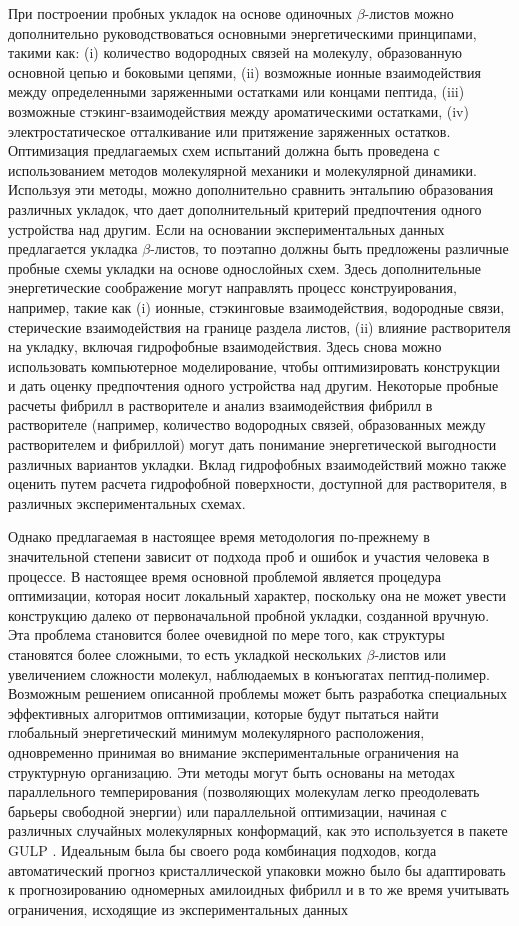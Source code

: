     При построении пробных укладок на основе одиночных $\beta$-листов можно дополнительно руководствоваться основными энергетическими принципами, такими как: (i) количество водородных связей на молекулу, образованную основной цепью и боковыми цепями, (ii) возможные ионные взаимодействия между определенными заряженными остатками или концами пептида, (iii) возможные стэкинг-взаимодействия между ароматическими остатками, (iv) электростатическое отталкивание или притяжение заряженных остатков. Оптимизация предлагаемых схем испытаний должна быть проведена с использованием методов молекулярной механики и молекулярной динамики. Используя эти методы, можно дополнительно сравнить энтальпию образования различных укладок, что дает дополнительный критерий предпочтения одного устройства над другим. Если на основании экспериментальных данных предлагается укладка $\beta$-листов, то поэтапно должны быть предложены различные пробные схемы укладки на основе однослойных схем. Здесь дополнительные энергетические соображение могут направлять процесс конструирования, например, такие как (i) ионные, стэкинговые взаимодействия, водородные связи, стерические взаимодействия на границе раздела листов, (ii) влияние растворителя на укладку, включая гидрофобные взаимодействия. Здесь снова можно использовать компьютерное моделирование, чтобы оптимизировать конструкции и дать оценку предпочтения одного устройства над другим. Некоторые пробные расчеты фибрилл в растворителе и анализ взаимодействия фибрилл в растворителе (например, количество водородных связей, образованных между растворителем и фибриллой) могут дать понимание энергетической выгодности различных вариантов укладки. Вклад гидрофобных взаимодействий можно также оценить путем расчета гидрофобной поверхности, доступной для растворителя, в различных экспериментальных схемах.
    
    Однако предлагаемая в настоящее время методология по-прежнему в значительной степени зависит от подхода проб и ошибок и участия человека в процессе. В настоящее время основной проблемой является процедура оптимизации, которая носит локальный характер, поскольку она не может увести конструкцию далеко от первоначальной пробной укладки, созданной вручную. Эта проблема становится более очевидной по мере того, как структуры становятся более сложными, то есть укладкой нескольких $\beta$-листов или увеличением сложности молекул, наблюдаемых в конъюгатах пептид-полимер. Возможным  решением описанной проблемы может быть разработка специальных эффективных алгоритмов оптимизации, которые будут пытаться найти глобальный энергетический минимум молекулярного расположения, одновременно принимая во внимание экспериментальные ограничения на структурную организацию. Эти методы могут быть основаны на методах параллельного темперирования (позволяющих молекулам легко преодолевать барьеры свободной энергии) \cite{deem_parallel_2005} или параллельной оптимизации, начиная с различных случайных молекулярных конформаций, как это используется в пакете GULP \cite{gale_general_2003}. Идеальным была бы своего рода комбинация подходов, когда автоматический прогноз кристаллической упаковки можно было бы адаптировать к прогнозированию одномерных амилоидных фибрилл и в то же время учитывать ограничения, исходящие из экспериментальных данных
    
